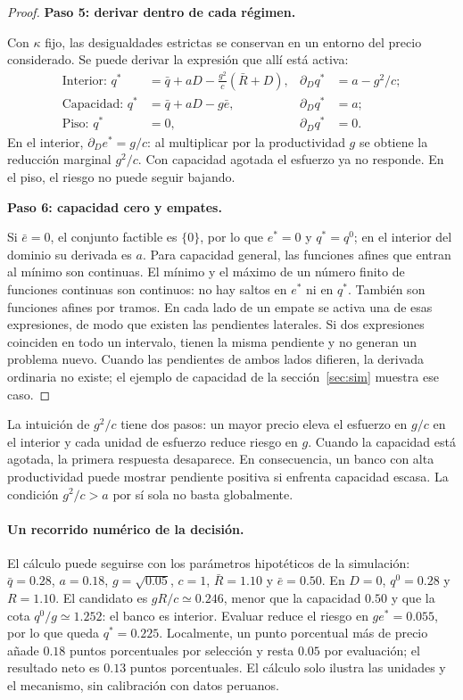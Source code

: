 \documentclass[11pt]{article}
\theoremstyle{definition}\newtheorem{assumption}{Supuesto}
\begin{document}
\begin{proof}
\textbf{Paso 5: derivar dentro de cada régimen.}\par
Con $\kappa$ fijo, las desigualdades estrictas se conservan en un entorno
del precio considerado. Se puede derivar la expresión que allí está activa:
\begin{align*}
\text{Interior: }q^*&=\bar q+aD-\frac{g^2}{c}(\bar R+D),
 &\partial_Dq^*&=a-g^2/c;\\
\text{Capacidad: }q^*&=\bar q+aD-g\bar e,
 &\partial_Dq^*&=a;\\
\text{Piso: }q^*&=0,
 &\partial_Dq^*&=0.
\end{align*}
En el interior, $\partial_De^*=g/c$: al multiplicar por la productividad $g$
se obtiene la reducción marginal $g^2/c$. Con capacidad agotada el esfuerzo
ya no responde. En el piso, el riesgo no puede seguir bajando.

\textbf{Paso 6: capacidad cero y empates.}\par
Si $\bar e=0$, el conjunto factible es $\{0\}$, por lo que $e^*=0$ y
$q^*=q^0$; en el interior del dominio su derivada es $a$. Para capacidad
general, las funciones afines que entran al mínimo son continuas. El mínimo
y el máximo de un número finito de funciones continuas son continuos: no
hay saltos en $e^*$ ni en $q^*$. También son funciones afines por tramos.
En cada lado de un empate se activa una de esas expresiones, de modo que
existen las pendientes laterales. Si dos expresiones coinciden en todo un
intervalo, tienen la misma pendiente y no generan un problema nuevo. Cuando
las pendientes de ambos lados difieren, la derivada ordinaria no existe;
el ejemplo de capacidad de la sección~\ref{sec:sim} muestra ese caso.
\end{proof}

La intuición de $g^2/c$ tiene dos pasos: un mayor precio eleva el esfuerzo en
$g/c$ en el interior y cada unidad de esfuerzo reduce riesgo en $g$. Cuando
la capacidad está agotada, la primera respuesta desaparece. En consecuencia,
un banco con alta productividad puede mostrar pendiente positiva si enfrenta
capacidad escasa. La condición $g^2/c>a$ por sí sola no basta globalmente.

\paragraph{Un recorrido numérico de la decisión.}
El cálculo puede seguirse con los parámetros hipotéticos de la simulación:
$\bar q=0.28$, $a=0.18$, $g=\sqrt{0.05}$, $c=1$, $\bar R=1.10$ y
$\bar e=0.50$. En $D=0$, $q^0=0.28$ y $R=1.10$. El candidato es
$gR/c\simeq0.246$, menor que la capacidad $0.50$ y que la cota
$q^0/g\simeq1.252$: el banco es interior. Evaluar reduce el riesgo en
$ge^*=0.055$, por lo que queda $q^*=0.225$. Localmente, un punto porcentual
más de precio añade $0.18$ puntos porcentuales por selección y resta $0.05$
por evaluación; el resultado neto es $0.13$ puntos porcentuales. El cálculo
solo ilustra las unidades y el mecanismo, sin calibración con datos peruanos.
\end{document}
